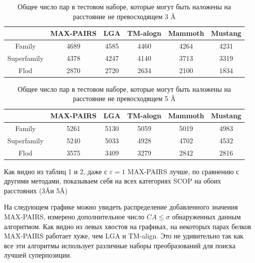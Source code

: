\documentclass[a4paper]{extreport}
\newcommand{\angstrom}{\text\normalfont\AA}
\newcommand{\eps}{\varepsilon}
\begin{document}
\begin{table}
\caption{ Общее число пар в тестовом наборе, которые могут быть наложены на расстояние не превосходящем 3 \angstrom}
\begin{center}
\begin{tabular}{|c|ccccc|}
\hline
& MAX-PAIRS & LGA & TM-alogn & Mammoth & Mustang\\
\hline
Family & 4689 & 4585 & 4460 & 4264 & 4231\\
Superfamily & 4378 & 4247 & 4140 & 3713 & 3319\\
Flod & 2870 & 2720 & 2634 & 2100 & 1834\\
\hline
\end{tabular}
\end{center}
\end{table}

\begin{table}
\caption{ Общее число пар в тестовом наборе, которые могут быть наложены на расстояние не превосходящем 5 \angstrom}
\begin{center}
\begin{tabular}{|c|ccccc|}
\hline
& MAX-PAIRS & LGA & TM-alogn & Mammoth & Mustang\\
\hline
Family & 5261 & 5130 & 5059 & 5019 & 4983\\
Superfamily & 5240 & 5033 & 4928 & 4702 & 4532\\
Flod & 3575 & 3409 & 3279 & 2842 & 2816\\
\hline
\end{tabular}
\end{center}
\end{table}

Как видно из таблиц 1 и 2, даже с $\eps=1$ MAX-PAIRS лучше, по сравнению с другими методами, показываем себя на всех категориях SCOP на обоих расстояних (3\angstrom и 5\angstrom)

На следующем графике можно увидеть распределение добавленного значения MAX-PAIRS, измерено дополнительное число $CA \leq \sigma$ обнаруженных данным алгоритмом. Как видно из левых хвостов на графиках, на некоторых парах белков MAX-PAIRS работает хуже, чем LGA и TM-align. Это не удивительно так как все эти алгоритмы использует различные наборы преобразований для поиска лучшей суперпозиции.
\end{document}

